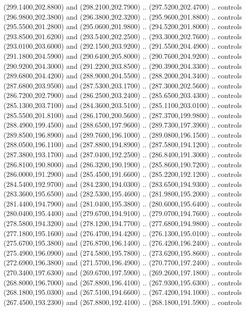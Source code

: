 {\begin{scope}[y=0.80pt, x=0.80pt, yscale=-1, xscale=1, inner sep=0pt, outer sep=0pt, #1]
      (299.1400,202.8800) and (298.2100,202.7900) .. (297.5200,202.4700) .. controls
      (296.9800,202.3800) and (296.3800,202.3200) .. (295.9600,201.8800) .. controls
      (295.5500,201.2800) and (295.0600,201.9800) .. (294.5200,201.8000) .. controls
      (293.8500,201.6200) and (293.5400,202.2500) .. (293.3000,202.7600) .. controls
      (293.0100,203.6000) and (292.1500,203.9200) .. (291.5500,204.4900) .. controls
      (291.1800,204.5900) and (290.6400,205.8000) .. (290.7600,204.9200) .. controls
      (290.9200,204.3000) and (291.2200,203.8500) .. (290.3900,204.3300) .. controls
      (289.6800,204.4200) and (288.9000,204.5500) .. (288.2000,204.3400) .. controls
      (287.6800,203.9500) and (287.5300,203.1700) .. (287.3000,202.5600) .. controls
      (286.7200,202.7900) and (286.2500,203.2400) .. (285.6500,203.4300) .. controls
      (285.1300,203.7100) and (284.3600,203.5100) .. (285.1100,203.0100) .. controls
      (285.5500,201.8100) and (286.1700,200.5600) .. (287.3700,199.9800) .. controls
      (288.4900,199.4500) and (288.6500,197.9600) .. (289.7300,197.3900) .. controls
      (289.8500,196.8900) and (289.7600,196.1000) .. (289.0800,196.1500) .. controls
      (288.0500,196.1100) and (287.8800,194.8900) .. (287.5800,194.1200) .. controls
      (287.3800,193.1700) and (287.0400,192.2500) .. (286.8400,191.3000) .. controls
      (286.8100,190.8000) and (286.3200,190.1900) .. (285.8600,190.7200) .. controls
      (286.0000,191.2900) and (285.4500,191.6600) .. (285.2200,192.1200) .. controls
      (284.5400,192.9700) and (284.2300,194.0300) .. (283.6500,194.9300) .. controls
      (283.3600,195.6500) and (282.5300,195.4600) .. (281.9800,195.2000) .. controls
      (281.4400,194.7900) and (281.0400,195.3800) .. (280.6000,195.6400) .. controls
      (280.0400,195.4400) and (279.6700,194.9100) .. (279.0700,194.7600) .. controls
      (278.5800,194.3200) and (278.1200,194.7700) .. (277.6800,194.9800) .. controls
      (277.1800,195.1600) and (276.4700,194.4200) .. (276.1300,195.0100) .. controls
      (275.6700,195.3800) and (276.8700,196.1400) .. (276.4200,196.2400) .. controls
      (275.4900,196.0900) and (274.5800,195.7800) .. (273.6200,195.8600) .. controls
      (272.6900,196.3800) and (271.5700,196.4900) .. (270.7700,197.2400) .. controls
      (270.3400,197.6300) and (269.6700,197.5900) .. (269.2600,197.1800) .. controls
      (268.8000,196.7000) and (267.8800,196.4100) .. (267.9300,195.6300) .. controls
      (268.1800,195.0300) and (267.5100,194.6600) .. (267.4200,194.1000) .. controls
      (267.4500,193.2300) and (267.8800,192.4100) .. (268.1800,191.5900) .. controls

\end{scope}}
